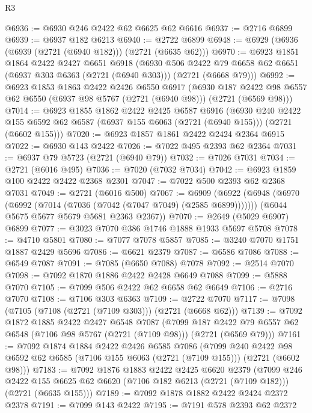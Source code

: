 \begin{lexlean}{R3}
\begin{coremodule}
@6936 := @6930 @246 @2422 @62 @6625 @62 @6616
@6937 := @2716 @6899
@6939 := @6937 @182 @6213
@6940 := @2722 @6899
@6948 := @6929 (@6936 (@6939 (@2721 (@6940 @182))) (@2721 (@6635 @62)))
@6970 := @6923
    @1851
    @1864
    @2422
    @2427
    @6651
    @6918
    (@6930
      @506
      @2422
      @79
      @6658
      @62
      @6651
      (@6937 @303 @6363 (@2721 (@6940 @303)))
      (@2721 (@6668 @79)))
@6992 := @6923
    @1853
    @1863
    @2422
    @2426
    @6550
    @6917
    (@6930 @187 @2422 @98 @6557 @62 @6550 (@6937 @98 @5767 (@2721 (@6940 @98))) (@2721 (@6569 @98)))
@7014 := @6923
    @1855
    @1862
    @2422
    @2425
    @6587
    @6916
    (@6930
      @240
      @2422
      @155
      @6592
      @62
      @6587
      (@6937 @155 @6063 (@2721 (@6940 @155)))
      (@2721 (@6602 @155)))
@7020 := @6923 @1857 @1861 @2422 @2424 @2364 @6915
@7022 := @6930 @143 @2422
@7026 := @7022 @495 @2393 @62 @2364
@7031 := @6937 @79 @5723 (@2721 (@6940 @79))
@7032 := @7026 @7031
@7034 := @2721 (@6016 @495)
@7036 := @7020 (@7032 @7034)
@7042 := @6923 @1859 @100 @2422 @2422 @2368 @2301
@7047 := @7022 @500 @2393 @62 @2368 @7031
@7049 := @2721 (@6016 @500)
@7067 := @6909
    (@6922
      (@6948 (@6970 (@6992 (@7014 (@7036 (@7042 (@7047 @7049) (@2585 @6899)))))))
      (@6044 @5675 @5677 @5679 @5681 @2363 @2367))
@7070 := @2649 (@5029 @6907) @6899
@7077 := @3023 @7070 @386 @1746 @1888 @1933 @5697 @5708
@7078 := @4710 @5801
@7080 := @7077 @7078 @5857
@7085 := @3240 @7070 @1751 @1887 @2429 @5696
@7086 := @6621 @2379
@7087 := @6586 @7086
@7088 := @6549 @7087
@7091 := @7085 (@6650 @7088) @7078
@7092 := @2514 @7070
@7098 := @7092 @1870 @1886 @2422 @2428 @6649 @7088
@7099 := @5888 @7070
@7105 := @7099 @506 @2422 @62 @6658 @62 @6649
@7106 := @2716 @7070
@7108 := @7106 @303 @6363
@7109 := @2722 @7070
@7117 := @7098 (@7105 (@7108 (@2721 (@7109 @303))) (@2721 (@6668 @62)))
@7139 := @7092
    @1872
    @1885
    @2422
    @2427
    @6548
    @7087
    (@7099 @187 @2422 @79 @6557 @62 @6548 (@7106 @98 @5767 (@2721 (@7109 @98))) (@2721 (@6569 @79)))
@7161 := @7092
    @1874
    @1884
    @2422
    @2426
    @6585
    @7086
    (@7099
      @240
      @2422
      @98
      @6592
      @62
      @6585
      (@7106 @155 @6063 (@2721 (@7109 @155)))
      (@2721 (@6602 @98)))
@7183 := @7092
    @1876
    @1883
    @2422
    @2425
    @6620
    @2379
    (@7099
      @246
      @2422
      @155
      @6625
      @62
      @6620
      (@7106 @182 @6213 (@2721 (@7109 @182)))
      (@2721 (@6635 @155)))
@7189 := @7092 @1878 @1882 @2422 @2424 @2372 @2378
@7191 := @7099 @143 @2422
@7195 := @7191 @578 @2393 @62 @2372

\end{coremodule}
\end{lexlean}
